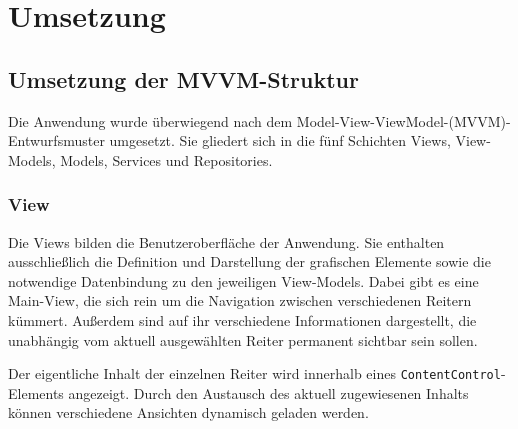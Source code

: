 \chapter{Umsetzung}
\label{cha:Umsetzung}

\section{Umsetzung der MVVM-Struktur}
Die Anwendung wurde überwiegend nach dem Model-View-ViewModel-(MVVM)-Entwurfsmuster umgesetzt. Sie gliedert sich in die fünf Schichten Views, View-Models, Models, Services und Repositories.
\subsection{View}
Die Views bilden die Benutzeroberfläche der Anwendung. Sie enthalten ausschließlich die Definition und Darstellung der grafischen Elemente sowie die notwendige Datenbindung zu den jeweiligen View-Models. Dabei gibt es eine Main-View, die sich rein um die Navigation zwischen verschiedenen Reitern kümmert. Außerdem sind auf ihr verschiedene Informationen dargestellt, die unabhängig vom aktuell ausgewählten Reiter permanent sichtbar sein sollen. 

Der eigentliche Inhalt der einzelnen Reiter wird innerhalb eines \lstinline|ContentControl|-Elements angezeigt. Durch den Austausch des aktuell zugewiesenen Inhalts können verschiedene Ansichten dynamisch geladen werden.

